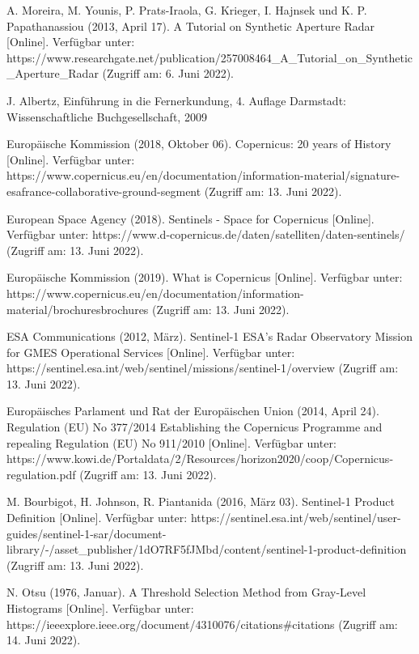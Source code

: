\newpage
\thispagestyle{empty}
\begin{thebibliography}{1}

A. Moreira, M. Younis, P. Prats-Iraola, G. Krieger, I. Hajnsek und K. P. Papathanassiou (2013, April 17). A Tutorial on Synthetic Aperture Radar [Online]. Verfügbar unter: 
https://www.researchgate.net/publication/257008464\_A\_Tutorial\_on\_Synthetic\_Aperture\_Radar
(Zugriff am: 6. Juni 2022).

J. Albertz, Einführung in die Fernerkundung, 4. Auflage Darmstadt: Wissenschaftliche Buchgesellschaft, 2009

Europäische Kommission (2018, Oktober 06). Copernicus: 20 years of History [Online]. Verfügbar unter: 
https://www.copernicus.eu/en/documentation/information-material/signature-esafrance-collaborative-ground-segment
(Zugriff am: 13. Juni 2022).

European Space Agency (2018). Sentinels - Space for Copernicus [Online]. Verfügbar unter: 
https://www.d-copernicus.de/daten/satelliten/daten-sentinels/
(Zugriff am: 13. Juni 2022).

Europäische Kommission (2019). What is Copernicus [Online]. Verfügbar unter: 
https://www.copernicus.eu/en/documentation/information-material/brochuresbrochures
(Zugriff am: 13. Juni 2022).

ESA Communications (2012, März). Sentinel-1 ESA's Radar Observatory Mission for GMES Operational Services [Online]. Verfügbar unter: 
https://sentinel.esa.int/web/sentinel/missions/sentinel-1/overview
(Zugriff am: 13. Juni 2022).

Europäisches Parlament und Rat der Europäischen Union (2014, April 24).  Regulation (EU) No 377/2014 Establishing the Copernicus Programme and repealing Regulation (EU) No 911/2010 [Online]. Verfügbar unter: 
https://www.kowi.de/Portaldata/2/Resources/horizon2020/coop/Copernicus-regulation.pdf
(Zugriff am: 13. Juni 2022).

M. Bourbigot, H. Johnson, R. Piantanida (2016, März 03). Sentinel-1 Product Definition [Online]. Verfügbar unter: 
https://sentinel.esa.int/web/sentinel/user-guides/sentinel-1-sar/document-library/-/asset\_publisher/1dO7RF5fJMbd/content/sentinel-1-product-definition
(Zugriff am: 13. Juni 2022).

N. Otsu (1976, Januar). A Threshold Selection Method from Gray-Level Histograms [Online]. Verfügbar unter: 
https://ieeexplore.ieee.org/document/4310076/citations\#citations
(Zugriff am: 14. Juni 2022).


\end{thebibliography}
